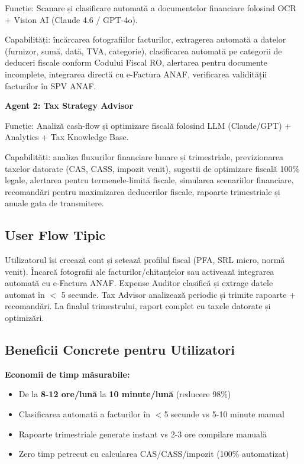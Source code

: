 \documentclass[11pt,a4paper]{article}
\begin{document}
Funcție: Scanare și clasificare automată a documentelor financiare folosind OCR + Vision AI (Claude 4.6 / GPT-4o).

Capabilități: încărcarea fotografiilor facturilor, extragerea automată a datelor (furnizor, sumă, dată, TVA, categorie), clasificarea automată pe categorii de deduceri fiscale conform Codului Fiscal RO, alertarea pentru documente incomplete, integrarea directă cu e-Factura ANAF, verificarea validității facturilor în SPV ANAF.

\textbf{Agent 2: Tax Strategy Advisor}

Funcție: Analiză cash-flow și optimizare fiscală folosind LLM (Claude/GPT) + Analytics + Tax Knowledge Base.

Capabilități: analiza fluxurilor financiare lunare și trimestriale, previzionarea taxelor datorate (CAS, CASS, impozit venit), sugestii de optimizare fiscală 100\% legale, alertarea pentru termenele-limită fiscale, simularea scenariilor financiare, recomandări pentru maximizarea deducerilor fiscale, rapoarte trimestriale și anuale gata de transmitere.

\subsection{User Flow Tipic}

Utilizatorul își creează cont și setează profilul fiscal (PFA, SRL micro, normă venit). Încarcă fotografii ale facturilor/chitanțelor sau activează integrarea automată cu e-Factura ANAF. Expense Auditor clasifică și extrage datele automat în $<$ 5 secunde. Tax Advisor analizează periodic și trimite rapoarte + recomandări. La finalul trimestrului, raport complet cu taxele datorate și optimizări.

\subsection{Beneficii Concrete pentru Utilizatori}

\textbf{Economii de timp măsurabile:}
\begin{itemize}[nosep]
    \item De la \textbf{8-12 ore/lună} la \textbf{10 minute/lună} (reducere 98\%)
    \item Clasificarea automată a facturilor în $<$5 secunde vs 5-10 minute manual
    \item Rapoarte trimestriale generate instant vs 2-3 ore compilare manuală
    \item Zero timp petrecut cu calcularea CAS/CASS/impozit (100\% automatizat)
\end{itemize}
\end{document}
